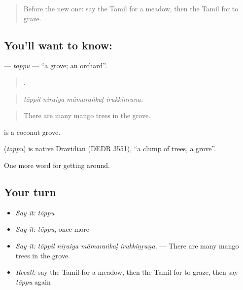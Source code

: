 \label{lesson:TA-C434-toppu}



\begin{quote}
Before the new one: say the Tamil for a meadow, then the Tamil for to graze.
\end{quote}

\subsection*{You'll want to know: }
\textbf{} — \emph{tōppu} — \textquotedblleft{}a grove; an orchard\textquotedblright{}.

\begin{quote}
   .
\end{quote}

\begin{quote}
\emph{tōppil niṟaiya māmaraṅkaḷ irukkiṉṟaṉa.}
\end{quote}

\begin{quote}
There are many mango trees in the grove.
\end{quote}

 is a coconut grove.

\begin{cousinweb}
\textbf{} (\emph{tōppu}) is native Dravidian (DEDR 3551), \textquotedblleft{}a clump of trees, a grove\textquotedblright{}.
\end{cousinweb}

\begin{grammarlens}[title={What you've built}]
One more word for getting around.
\end{grammarlens}

\subsection*{Your turn}
\begin{itemize}
\raggedright
  \item \emph{Say it:} \emph{tōppu}
  \item \emph{Say it:} \emph{tōppu}, once more
  \item \emph{Say it:} \emph{tōppil niṟaiya māmaraṅkaḷ irukkiṉṟaṉa.} — There are many mango trees in the grove.
  \item \emph{Recall:} say the Tamil for a meadow, then the Tamil for to graze, then say \emph{tōppu} again
\end{itemize}


